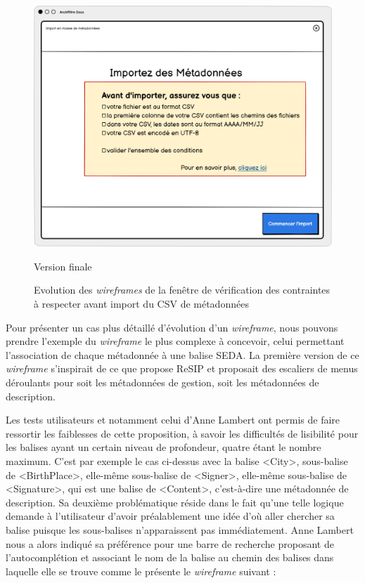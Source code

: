 \begin{figure}[h]
\begin{minipage}[b]{0.45\textwidth}
		\includegraphics[width=\textwidth]{illustrations/figure22.png} 
		\caption{Version finale}
		\label{figure22}
	\end{minipage}
	\caption{Evolution des \textit{\gls{wireframe}s} de la fenêtre de vérification des contraintes à respecter avant import du CSV de métadonnées }
	\label{fig:sidebyside2}
\end{figure}


Pour présenter un cas plus détaillé d’évolution d’un \textit{\gls{wireframe}}, nous pouvons prendre l’exemple du \textit{\gls{wireframe}} le plus complexe à concevoir, celui permettant l’association de chaque métadonnée à une balise \gls{SEDA}.  La première version de ce \textit{\gls{wireframe}} s’inspirait de ce que propose ReSIP et proposait des escaliers de menus déroulants pour soit les métadonnées de gestion, soit les métadonnées de description. 

\clearpage



Les tests utilisateurs et notamment celui d’Anne Lambert ont permis de faire ressortir les faiblesses de cette proposition, à savoir les difficultés de lisibilité pour les balises ayant un certain niveau de profondeur, quatre étant le nombre maximum. C’est par exemple le cas ci-dessus avec la balise <City>, sous-balise de <BirthPlace>, elle-même sous-balise de <Signer>, elle-même sous-balise de <Signature>, qui est une balise de <Content>, c'est-à-dire une métadonnée de description. Sa deuxième problématique réside dans le fait qu’une telle logique demande à l’utilisateur d’avoir préalablement une idée d’où aller chercher sa balise puisque les sous-balises n’apparaissent pas immédiatement. Anne Lambert nous a alors indiqué sa préférence pour une barre de recherche proposant de l’autocomplétion et associant le nom de la balise au chemin des balises dans laquelle elle se trouve comme le présente le \textit{\gls{wireframe}} suivant : 

